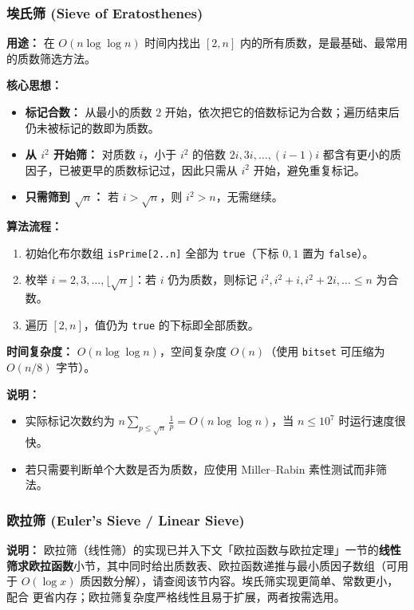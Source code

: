 \subsubsection{埃氏筛 (Sieve of Eratosthenes)}

\textbf{用途：}
在 $O(n \log \log n)$ 时间内找出 $[2, n]$ 内的所有质数，是最基础、最常用的质数筛选方法。

\textbf{核心思想：}
\begin{itemize}
    \item \textbf{标记合数：} 从最小的质数 $2$ 开始，依次把它的倍数标记为合数；遍历结束后仍未被标记的数即为质数。
    \item \textbf{从 $i^2$ 开始筛：} 对质数 $i$，小于 $i^2$ 的倍数 $2i, 3i, \dots, (i-1)i$ 都含有更小的质因子，已被更早的质数标记过，因此只需从 $i^2$ 开始，避免重复标记。
    \item \textbf{只需筛到 $\sqrt{n}$：} 若 $i > \sqrt{n}$，则 $i^2 > n$，无需继续。
\end{itemize}

\textbf{算法流程：}
\begin{enumerate}
    \item 初始化布尔数组 \texttt{isPrime[2..n]} 全部为 \texttt{true}（下标 $0, 1$ 置为 \texttt{false}）。
    \item 枚举 $i = 2, 3, \dots, \lfloor\sqrt{n}\rfloor$：若 $i$ 仍为质数，则标记 $i^2, i^2+i, i^2+2i, \dots \le n$ 为合数。
    \item 遍历 $[2, n]$，值仍为 \texttt{true} 的下标即全部质数。
\end{enumerate}

\textbf{时间复杂度：} $O(n \log \log n)$，空间复杂度 $O(n)$（使用 \texttt{bitset} 可压缩为 $O(n/8)$ 字节）。



\textbf{说明：}
\begin{itemize}
    \item 实际标记次数约为 $n \sum_{p \le \sqrt{n}} \frac{1}{p} = O(n \log \log n)$，当 $n \le 10^7$ 时运行速度很快。
    \item 若只需要判断单个大数是否为质数，应使用 Miller--Rabin 素性测试而非筛法。
\end{itemize}

\subsubsection{欧拉筛 (Euler's Sieve / Linear Sieve)}

\textbf{说明：} 欧拉筛（线性筛）的实现已并入下文「欧拉函数与欧拉定理」一节的\textbf{线性筛求欧拉函数}小节，其中同时给出质数表、欧拉函数递推与最小质因子数组（可用于 $O(\log x)$ 质因数分解），请查阅该节内容。埃氏筛实现更简单、常数更小，配合  更省内存；欧拉筛复杂度严格线性且易于扩展，两者按需选用。

